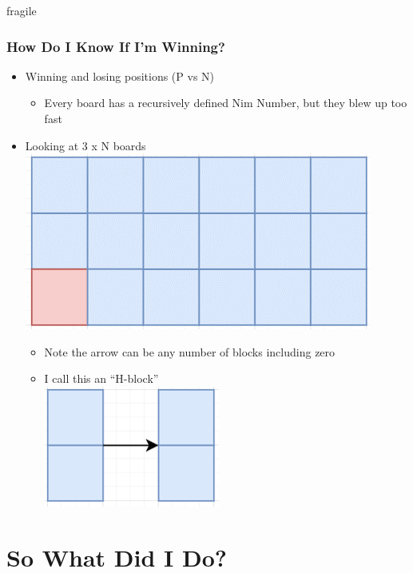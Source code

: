 \documentclass[aspectratio=169,usenames,dvipsnames]{beamer}
\begin{document}
\begin{frame}{fragile}
    \frametitle{How Do I Know If I'm Winning?}

    \begin{itemize}
       \item Winning and losing positions (P vs N)
        \begin{itemize}
            \item Every board has a recursively defined Nim Number, but they blew up too fast
        \end{itemize} 
        \item Looking at 3 x N boards\\
        \includegraphics[scale=.5]{3 x 6 board.png}
        \begin{itemize}
            \item Note the arrow can be any number of blocks including zero
            \item I call this an “H-block”\\
            \includegraphics[scale=.25]{2 H block.png}
        \end{itemize}
    \end{itemize}
\end{frame}


\section{So What Did I Do?}
\end{document}
